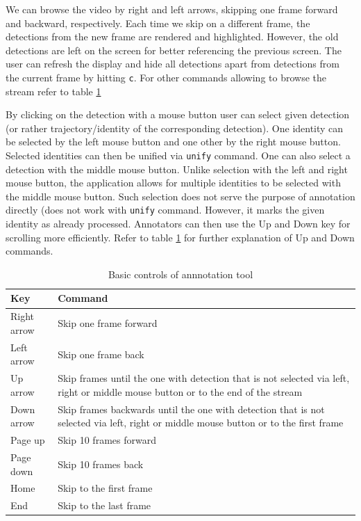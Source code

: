 We can browse the video by right and left arrows, skipping one frame forward and
backward, respectively. Each time we skip on a different frame, the detections from
the new frame are rendered and highlighted. However, the old detections are left
on the screen for better referencing the previous screen. The user can refresh the display
and hide all detections apart from detections from the current frame by hitting \verb+c+.
For other commands allowing to browse the stream refer to table
\ref{tab:annotation_basic_commands}

By clicking on the detection with a mouse button user can select given detection (or rather trajectory/identity of the corresponding detection). One identity can be selected
by the left mouse button and one other by the right mouse button. Selected identities can then be unified via \verb+unify+ command. One can also select a detection with the
middle mouse button. Unlike selection with the left and right mouse button, the application
allows for multiple identities to be selected with the middle mouse button. Such selection
does not serve the purpose of annotation directly (does not work with \verb+unify+ command.
However, it marks the given identity as already processed. Annotators can then use the Up and Down key for scrolling more efficiently. Refer to table 
\ref{tab:annotation_basic_commands} for further explanation of Up and Down commands.

\begin{table}
    \centering
    \begin{tabularx}{\textwidth}{l|X}
         \textbf{Key} & \textbf{Command} \\ \hline
         Right arrow & Skip one frame forward \\ \hline
         Left arrow & Skip one frame back \\ \hline
         Up arrow & Skip frames until the one with detection that is not selected
         via left, right or middle mouse button or to the end of the stream \\ \hline
         Down arrow & Skip frames backwards until the one with detection that is not selected via left, right or middle mouse button or to the first frame \\ \hline
         Page up & Skip 10 frames forward \\ \hline
         Page down & Skip 10 frames back \\ \hline
         Home & Skip to the first frame \\ \hline
         End & Skip to the last frame
    \end{tabularx}
    \caption{Basic controls of annnotation tool}
    \label{tab:annotation_basic_commands}
\end{table}

